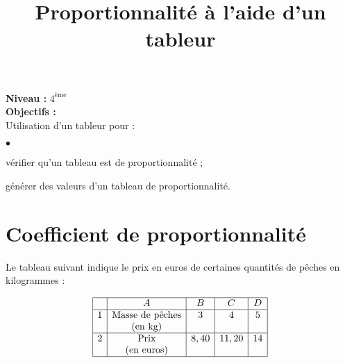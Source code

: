 \documentclass{article}
\title{Proportionnalité à l'aide d'un tableur}
\author{}
\date{}
\begin{document}
\maketitle

{\bf Niveau :} $4^{\textrm{ème}}$  \\

{\bf Objectifs :}  \\

Utilisation d'un tableur pour : 
\begin{list}{$\bullet$}{}
\item vérifier qu'un tableau est de proportionnalité ;
\item générer des valeurs d'un tableau de proportionnalité.
\end{list}




\section{Coefficient de proportionnalité}





Le tableau suivant indique le prix en euros de certaines quantités de pêches en kilogrammes :

\begin{equation*}
  \begin{array}{|c|c|c|c|c|}
    \hline
    & A & B & C & D \\
    \hline
    1 & \textrm{Masse de pêches} & 3 & 4 & 5 \\
    & \textrm{(en kg)} & & & \\
    \hline
    2 & \textrm{Prix} & 8,40 & 11,20 & 14 \\
    & \textrm{(en euros)} & & & \\
    \hline
  \end{array}
\end{equation*}
\end{document}
